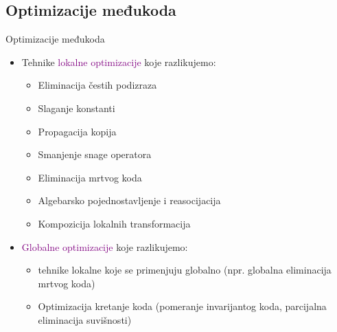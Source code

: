 \documentclass[compress, containsverbatim,mathserif, xcolor=dvipsnames, unicode]{beamer}
\begin{document}
\subsection{Optimizacije međukoda}
\begin{frame}{Optimizacije međukoda}

    \begin{itemize}
        
        \item Tehnike \textcolor{purple}{lokalne optimizacije} koje razlikujemo: 
                \begin{itemize}
                    \item Eliminacija čestih podizraza
                    \item Slaganje konstanti
                    \item Propagacija kopija
                    \item Smanjenje snage operatora
                    \item Eliminacija mrtvog koda
                    \item Algebarsko pojednostavljenje i reasocijacija
                    \item Kompozicija lokalnih transformacija
                \end{itemize}
        \item \textcolor{purple}{Globalne optimizacije} koje razlikujemo: 
                \begin{itemize}
                    \item tehnike lokalne koje se primenjuju globalno (npr. globalna eliminacija mrtvog koda)
                    \item Optimizacija kretanje koda (pomeranje invarijantog koda, parcijalna eliminacija suvišnosti)
                \end{itemize}
    \end{itemize}
        
\end{frame}
\end{document}

